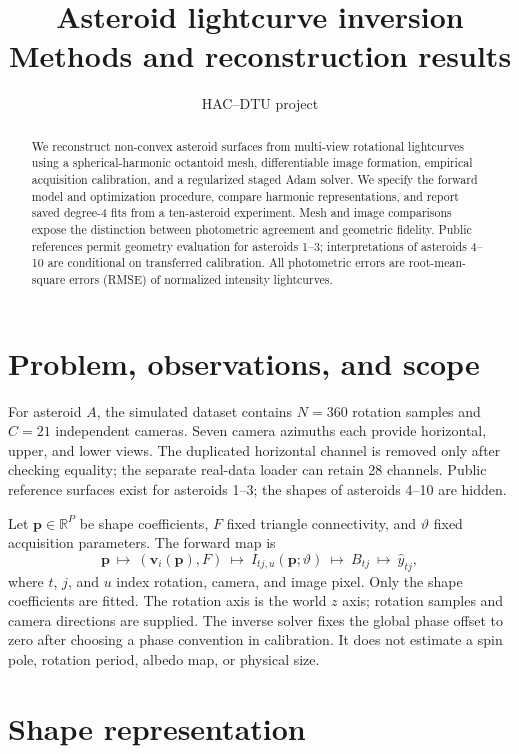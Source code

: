 \documentclass[10pt,a4paper]{article}
\title{Asteroid lightcurve inversion\\\large Methods and reconstruction results}
\author{HAC--DTU project}
\date{}
\newcommand{\vect}[1]{\bm{#1}}
\newcommand{\R}{\mathbb{R}}
\begin{document}
\maketitle
\begin{abstract}
We reconstruct non-convex asteroid surfaces from multi-view rotational
lightcurves using a spherical-harmonic octantoid mesh, differentiable image
formation, empirical acquisition calibration, and a regularized staged Adam
solver. We specify the forward model and optimization procedure, compare
harmonic representations, and report saved degree-4 fits from a ten-asteroid
experiment. Mesh and image comparisons expose the distinction between
photometric agreement and geometric fidelity. Public references permit
geometry evaluation for asteroids 1--3; interpretations of asteroids 4--10
are conditional on transferred calibration. All photometric errors are
root-mean-square errors (RMSE) of normalized intensity lightcurves.
\end{abstract}

\section{Problem, observations, and scope}
For asteroid $A$, the simulated dataset contains $N=360$ rotation samples
and $C=21$ independent cameras. Seven camera azimuths each provide
horizontal, upper, and lower views. The duplicated horizontal channel is
removed only after checking equality; the separate real-data loader can
retain 28 channels. Public reference surfaces exist for asteroids 1--3;
the shapes of asteroids 4--10 are hidden.

Let $\vect p\in\R^P$ be shape coefficients, $F$ fixed triangle connectivity,
and $\vartheta$ fixed acquisition parameters. The forward map is
\begin{equation}
 \vect p\ \longmapsto\ (\vect v_i(\vect p),F)
 \ \longmapsto\ I_{tj,u}(\vect p;\vartheta)
 \ \longmapsto\ B_{tj}\ \longmapsto\ \widehat y_{tj},
 \label{eq:pipeline}
\end{equation}
where $t$, $j$, and $u$ index rotation, camera, and image pixel.
Only the shape coefficients are fitted. The rotation axis is the world
$z$ axis; rotation samples and camera directions are supplied. The
inverse solver fixes the global phase offset to zero after
choosing a phase convention in calibration. It does not estimate a spin
pole, rotation period, albedo map, or physical size.

\section{Shape representation}
\end{document}
